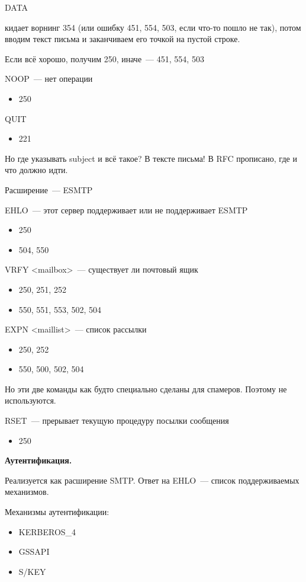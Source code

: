 DATA

кидает ворнинг 354 (или ошибку 451, 554, 503, если что-то пошло не так), потом вводим текст письма и заканчиваем его точкой на пустой строке.

Если всё хорошо, получим 250, иначе~--- 451, 554, 503

NOOP~--- нет операции
\begin{itemize}
    \item 250
\end{itemize}

QUIT
\begin{itemize}
    \item 221
\end{itemize}

Но где указывать subject и всё такое? В тексте письма! В RFC прописано, где и что должно идти.

Расширение~--- ESMTP

EHLO~--- этот сервер поддерживает или не поддерживает ESMTP
\begin{itemize}
    \item 250
    \item 504, 550
\end{itemize}

VRFY <mailbox>~--- существует ли почтовый ящик
\begin{itemize}
    \item 250, 251, 252
    \item 550, 551, 553, 502, 504
\end{itemize}

EXPN <maillist>~--- список рассылки
\begin{itemize}
    \item 250, 252
    \item 550, 500, 502, 504
\end{itemize}

Но эти две команды как будто специально сделаны для спамеров. Поэтому не используются.

RSET~--- прерывает текущую процедуру посылки сообщения
\begin{itemize}
    \item 250
\end{itemize}

{\bf Аутентификация.}

Реализуется как расширение SMTP. Ответ на EHLO~--- список поддерживаемых механизмов.

Механизмы аутентификации:
\begin{itemize}
    \item KERBEROS\_4
    \item GSSAPI
    \item S/KEY
\end{itemize}

